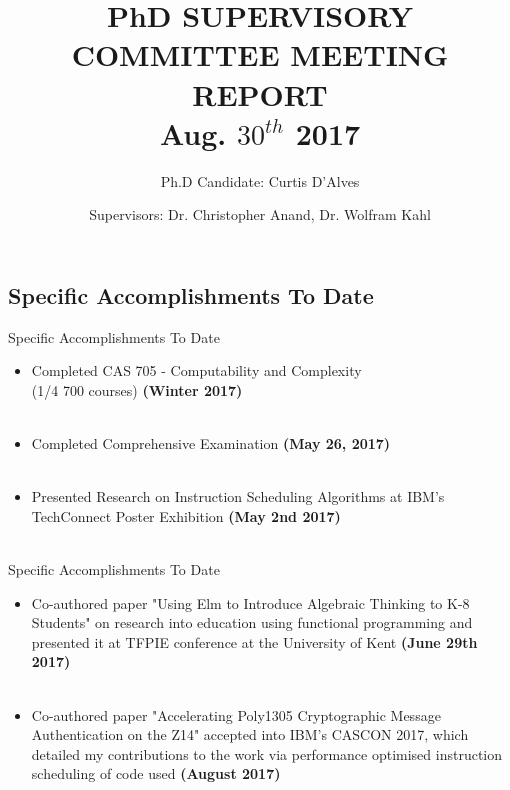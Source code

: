 \documentclass{beamer}
\title{\normalsize PhD SUPERVISORY COMMITTEE MEETING REPORT \\
        Aug. $30^{th}$ 2017} %
\subtitle{Ph.D Candidate: Curtis D'Alves} %
\author{Supervisors: Dr. Christopher Anand, Dr. Wolfram Kahl}
\begin{document}
  \frame{\maketitle}


  \begin{darkframes}
\section{Specific Accomplishments To Date}
\begin{frame}{Specific Accomplishments To Date}
\begin{itemize}
 \item Completed CAS 705 - Computability and Complexity \\
 (1/4 700 courses) { \bf \color{green} (Winter 2017)} \\
 \qquad \\
 \item Completed Comprehensive Examination { \bf \color{green} (May 26, 2017)} \\
 \qquad \\
 \item Presented Research on Instruction Scheduling Algorithms at IBM's TechConnect Poster Exhibition { \bf \color{green} (May 2nd 2017)} \\
 \qquad \\
\end{itemize}
\end{frame}

\begin{frame}{Specific Accomplishments To Date}
\begin{itemize}
 \item Co-authored paper "Using Elm to Introduce Algebraic Thinking to K-8 Students" on research into education using functional programming and presented it at TFPIE conference at the University of Kent { \bf \color{green} (June 29th 2017)} \\
 \qquad \\
 \item Co-authored paper "Accelerating Poly1305 Cryptographic Message Authentication on the Z14" accepted into IBM's CASCON 2017, which detailed my contributions to the work via performance optimised instruction scheduling of code used { \bf \color{green} (August 2017)}
\end{itemize}
\end{frame}



\end{darkframes}
\end{document}

